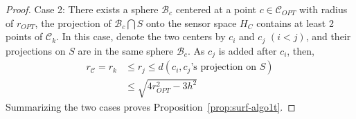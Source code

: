 \begin{proof}
Case 2: There exists a sphere $\mathcal{B}_{c}$ centered at a point $c\in\mathcal{C}_{OPT}$ with radius of $r_{OPT}$, the projection of $\mathcal{B}_{c}\bigcap S$ onto the sensor space $H_C$
contains at least 2 points of $\mathcal{C}_k$. 
In this case, denote the two centers by $c_i$ and $c_j$ $(i<j)$, and their projections on $S$ are in the same sphere $\mathcal{B}_c$. As $c_j$ is added after $c_i$, then,
\begin{equation}
    \begin{split}
    r_\mathcal{C} = r_k 
    &\leq r_{j}
    \leq d(c_i, c_j\text{'s projection on } S)\\
    &\leq \sqrt{4r_{OPT}^2 - 3h^2}
    \end{split}
\end{equation}
Summarizing the two cases proves Proposition~\ref{prop:surf-algo1t}.
\vspace{-2mm}
\end{proof}

\vspace{-0.05in}